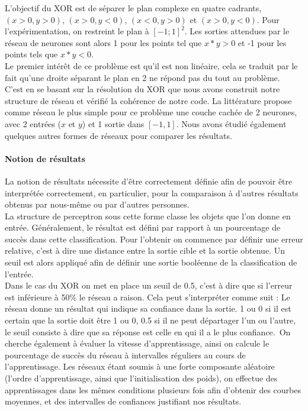 L'objectif du XOR est de séparer le plan complexe en quatre cadrants, $(x >0, y > 0)$, $ (x>0, y<0)$, $ (x<0, y>0)$ et $ (x>0, y<0) $. Pour l'expérimentation, on restreint le plan à $[-1;1]^2$. Les sorties attendues par le réseau de neurones sont alors 1 pour les points tel que $x*y > 0 $ et -1 pour les points tels que $x*y<0$. \\
Le premier intérêt de ce problème est qu'il est non linéaire, cela se traduit par le fait qu'une droite séparant le plan en 2 ne répond pas du tout au problème.\\

C'est en se basant sur la résolution du XOR que nous avons construit notre structure de réseau et vérifié la cohérence de notre code. La littérature propose comme réseau le plus simple pour ce problème une couche cachée de 2 neurones, avec 2 entrées ($x$ et $y$) et 1 sortie dans $[-1, 1]$. Nous avons étudié également quelques autres formes de réseaux pour comparer les résultats.

\paragraph{Notion de résultats} %
\label{par:notion_de_resultats}
La notion de résultats nécessite d'être correctement définie afin de pouvoir être interprétée correctement, en particulier, pour la comparaison à d'autres résultats obtenus par nous-même ou par d'autres personnes. \\
La structure de perceptron sous cette forme classe les objets que l'on donne en entrée. Généralement, le résultat est défini par rapport à un pourcentage de succès dans cette classification. Pour l'obtenir on commence par définir une erreur relative, c'est à dire une distance entre la sortie cible et la sortie obtenue. Un seuil est alors appliqué afin de définir une sortie booléenne de la classification de l'entrée.\\
Dans le cas du XOR on met en place un seuil de 0.5, c'est à dire que si l'erreur est inférieure à 50\% le réseau a raison. Cela peut s’interpréter comme suit : Le réseau donne un résultat qui indique sa confiance dans la sortie. 1 ou 0 si il est certain que la sortie doit être 1 ou 0, 0.5 si il ne peut départager l'un ou l'autre, le seuil consiste à dire que sa réponse est celle en qui il a le plus confiance.\
On cherche également à évaluer la vitesse d'apprentissage, ainsi on calcule le pourcentage de succès du réseau à intervalles réguliers au cours de l'apprentissage. Les réseaux étant soumis à une forte composante aléatoire (l'ordre d'apprentissage, ainsi que l'initialisation des poids), on effectue des apprentissages dans les mêmes conditions plusieurs fois afin d'obtenir des courbes moyennes, et des intervalles de confiances justifiant nos résultats.

